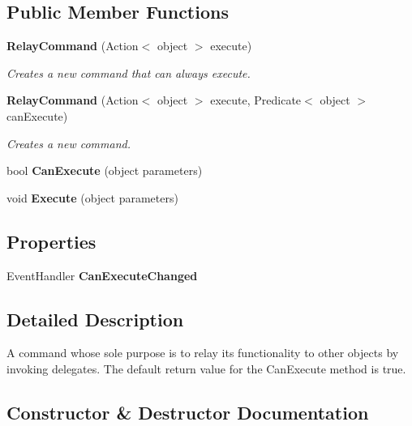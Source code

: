 \subsection*{Public Member Functions}
\begin{DoxyCompactItemize}
\item 
\textbf{ Relay\+Command} (Action$<$ object $>$ execute)
\begin{DoxyCompactList}\small\item\em Creates a new command that can always execute. \end{DoxyCompactList}\item 
\textbf{ Relay\+Command} (Action$<$ object $>$ execute, Predicate$<$ object $>$ can\+Execute)
\begin{DoxyCompactList}\small\item\em Creates a new command. \end{DoxyCompactList}\item 
bool \textbf{ Can\+Execute} (object parameters)
\item 
void \textbf{ Execute} (object parameters)
\end{DoxyCompactItemize}
\subsection*{Properties}
\begin{DoxyCompactItemize}
\item 
Event\+Handler \textbf{ Can\+Execute\+Changed}
\end{DoxyCompactItemize}


\subsection{Detailed Description}
A command whose sole purpose is to relay its functionality to other objects by invoking delegates. The default return value for the Can\+Execute method is \textquotesingle{}true\textquotesingle{}. 



\subsection{Constructor \& Destructor Documentation}
\mbox{\label{class_a_f_h___scheduler_1_1_helper___classes_1_1_relay_command_ab7eb476950fee37c8aa552f15a7cc92b}} 
